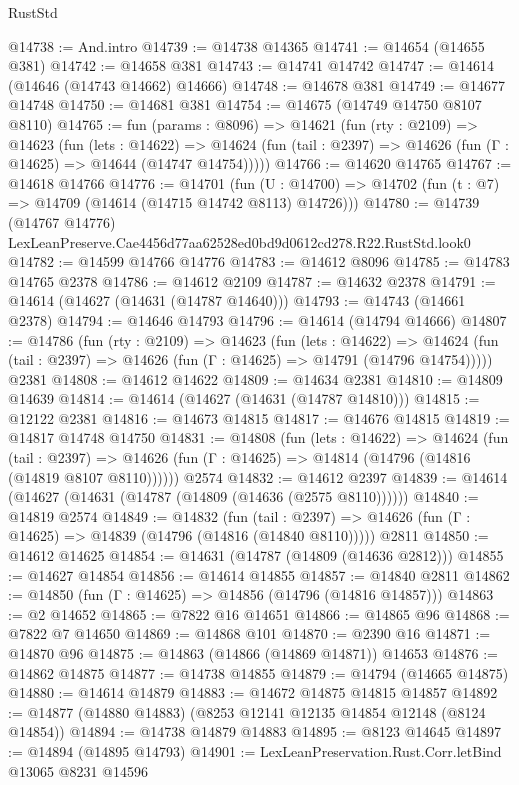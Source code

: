 \begin{lexlean}{RustStd}
\begin{coremodule}
@14738 := And.intro
@14739 := @14738 @14365
@14741 := @14654 (@14655 @381)
@14742 := @14658 @381
@14743 := @14741 @14742
@14747 := @14614 (@14646 (@14743 @14662) @14666)
@14748 := @14678 @381
@14749 := @14677 @14748
@14750 := @14681 @381
@14754 := @14675 (@14749 @14750 @8107 @8110)
@14765 := fun (params : @8096) =>
  @14621
    (fun (rty : @2109) =>
    @14623
      (fun (lets : @14622) =>
      @14624 (fun (tail : @2397) => @14626 (fun (Γ : @14625) => @14644 (@14747 @14754)))))
@14766 := @14620 @14765
@14767 := @14618 @14766
@14776 := @14701
    (fun (U : @14700) => @14702 (fun (t : @7) => @14709 (@14614 (@14715 @14742 @8113) @14726)))
@14780 := @14739 (@14767 @14776) LexLeanPreserve.Cae4456d77aa62528ed0bd9d0612cd278.R22.RustStd.look0
@14782 := @14599 @14766 @14776
@14783 := @14612 @8096
@14785 := @14783 @14765 @2378
@14786 := @14612 @2109
@14787 := @14632 @2378
@14791 := @14614 (@14627 (@14631 (@14787 @14640)))
@14793 := @14743 (@14661 @2378)
@14794 := @14646 @14793
@14796 := @14614 (@14794 @14666)
@14807 := @14786
    (fun (rty : @2109) =>
    @14623
      (fun (lets : @14622) =>
      @14624 (fun (tail : @2397) => @14626 (fun (Γ : @14625) => @14791 (@14796 @14754)))))
    @2381
@14808 := @14612 @14622
@14809 := @14634 @2381
@14810 := @14809 @14639
@14814 := @14614 (@14627 (@14631 (@14787 @14810)))
@14815 := @12122 @2381
@14816 := @14673 @14815
@14817 := @14676 @14815
@14819 := @14817 @14748 @14750
@14831 := @14808
    (fun (lets : @14622) =>
    @14624
      (fun (tail : @2397) =>
      @14626 (fun (Γ : @14625) => @14814 (@14796 (@14816 (@14819 @8107 @8110))))))
    @2574
@14832 := @14612 @2397
@14839 := @14614 (@14627 (@14631 (@14787 (@14809 (@14636 (@2575 @8110))))))
@14840 := @14819 @2574
@14849 := @14832
    (fun (tail : @2397) => @14626 (fun (Γ : @14625) => @14839 (@14796 (@14816 (@14840 @8110)))))
    @2811
@14850 := @14612 @14625
@14854 := @14631 (@14787 (@14809 (@14636 @2812)))
@14855 := @14627 @14854
@14856 := @14614 @14855
@14857 := @14840 @2811
@14862 := @14850 (fun (Γ : @14625) => @14856 (@14796 (@14816 @14857)))
@14863 := @2 @14652
@14865 := @7822 @16 @14651
@14866 := @14865 @96
@14868 := @7822 @7 @14650
@14869 := @14868 @101
@14870 := @2390 @16
@14871 := @14870 @96
@14875 := @14863 (@14866 (@14869 @14871)) @14653
@14876 := @14862 @14875
@14877 := @14738 @14855
@14879 := @14794 (@14665 @14875)
@14880 := @14614 @14879
@14883 := @14672 @14875 @14815 @14857
@14892 := @14877 (@14880 @14883) (@8253 @12141 @12135 @14854 @12148 (@8124 @14854))
@14894 := @14738 @14879 @14883
@14895 := @8123 @14645
@14897 := @14894 (@14895 @14793)
@14901 := LexLeanPreservation.Rust.Corr.letBind @13065 @8231 @14596

\end{coremodule}
\end{lexlean}
